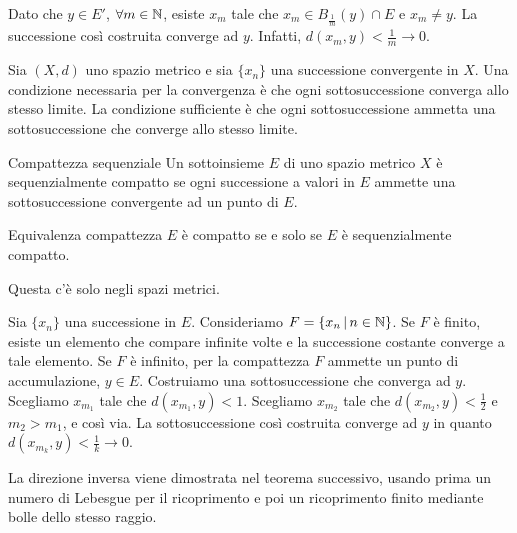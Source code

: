 \documentclass[a4paper]{article}
\begin{document}
\begin{snippetproof}{}
    Dato che \(y\in E'\), \(\forall m \in \mathbb{N}\), esiste \(x_m\) tale che
    \(x_m \in B_{\frac{1}{m}}(y) \cap E\) e \(x_m \neq y\).
    La successione così costruita converge ad \(y\).
    Infatti, \(d(x_m, y) < \frac{1}{m} \to 0\).
\end{snippetproof}

\begin{snippetproposition}{}
    Sia \((X,d)\) uno spazio metrico e sia \(\{x_n\}\) una successione convergente in \(X\).
    Una condizione necessaria per la convergenza è che ogni sottosuccessione converga allo stesso limite.
    La condizione sufficiente è che ogni sottosuccessione ammetta una sottosuccessione
    che converge allo stesso limite.
\end{snippetproposition}

\begin{snippetdefinition}{Compattezza sequenziale}
    Un sottoinsieme \(E\) di uno spazio metrico \(X\) è sequenzialmente compatto se ogni successione
    a valori in \(E\) ammette una sottosuccessione convergente ad un punto di \(E\). 
\end{snippetdefinition}

\begin{snippetproposition}{Equivalenza compattezza}
    \(E\) è compatto se e solo se \(E\) è sequenzialmente compatto.
\end{snippetproposition}

Questa c'è solo negli spazi metrici.

\begin{snippetproof}{}
    \begin{iffproof}
        \item Sia \(\{x_n\}\) una successione in \(E\).
        Consideriamo \(F = \{x_n \,|\, n\in \mathbb{N}\}\).
        Se \(F\) è finito, esiste un elemento che compare infinite volte
        e la successione costante converge a tale elemento.
        Se \(F\) è infinito, per la compattezza \(F\) ammette un punto di accumulazione, \(y\in E\).
        Costruiamo una sottosuccessione che converga ad \(y\).
        Scegliamo \(x_{m_1}\) tale che \(d(x_{m_1}, y) < 1\).
        Scegliamo \(x_{m_2}\) tale che \(d(x_{m_2}, y) < \frac{1}{2}\) e \(m_2 > m_1\), e così via.
        La sottosuccessione così costruita converge ad \(y\) in quanto \(d(x_{m_k}, y) < \frac{1}{k} \to 0\).
        \item La direzione inversa viene dimostrata nel teorema successivo, usando prima
        un numero di Lebesgue per il ricoprimento e poi un ricoprimento finito mediante bolle
        dello stesso raggio.
    \end{iffproof}
\end{snippetproof}
\end{document}
